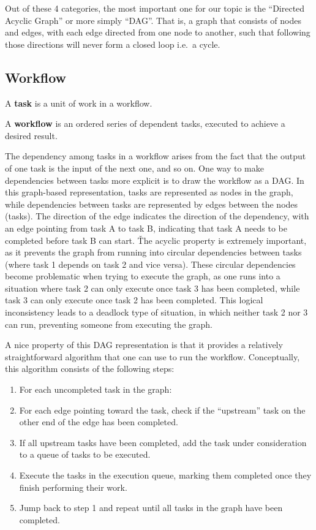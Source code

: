 Out of these 4 categories, the most important one for our topic is the ``Directed Acyclic Graph'' or more simply
``DAG''. That is, a graph that consists of nodes and edges, with each edge directed from one node to another, such
that following those directions will never form a closed loop i.e.\ a cycle.

\subsection{Workflow}

\bd[Task]
A \textbf{task} is a unit of work in a workflow.
\ed

\bd[Workflow]
A \textbf{workflow} is an ordered series of dependent tasks, executed to achieve a desired result.
\ed

The dependency among tasks in a workflow arises from the fact that the output of one task is the input of the next
one, and so on. One way to make dependencies between tasks more explicit is to draw the workflow as a DAG. In this
graph-based representation, tasks are represented as nodes in the graph, while dependencies between tasks are
represented by edges between the nodes (tasks). The direction of the edge indicates the direction of the dependency,
with an edge pointing from task A to task B, indicating that task A needs to be completed before task B can start. \v

The acyclic property is extremely important, as it prevents the graph from running into circular dependencies between
tasks (where task 1 depends on task 2 and vice versa). These circular dependencies become problematic when trying
to execute the graph, as one runs into a situation where task 2 can only execute once task 3 has been completed, while
task 3 can only execute once task 2 has been completed. This logical inconsistency leads to a deadlock type of
situation, in which neither task 2 nor 3 can run, preventing someone from executing the graph.


A nice property of this DAG representation is that it provides a relatively straightforward algorithm that one can use
to run the workflow. Conceptually, this algorithm consists of the following steps:
\begin{mdframed}
\begin{enumerate}
\item For each uncompleted task in the graph:
\bit
\item For each edge pointing toward the task, check if the ``upstream'' task on the other end of the edge has been
completed.
\item If all upstream tasks have been completed, add the task under consideration to a queue of tasks to be executed.
\eit
\item Execute the tasks in the execution queue, marking them completed once they finish performing their work.
\item Jump back to step 1 and repeat until all tasks in the graph have been completed.
\end{enumerate}
\end{mdframed}

